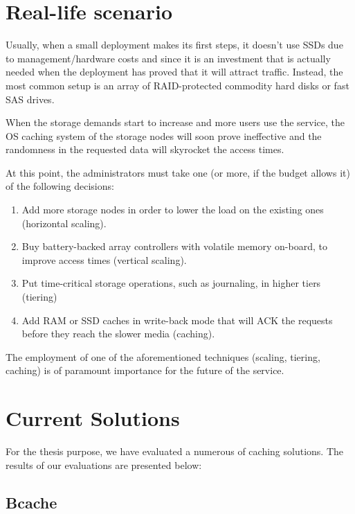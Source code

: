 \section{Real-life scenario}\label{sec:real-life-triad}

Usually, when a small deployment makes its first steps, it doesn't use SSDs due 
to management/hardware costs and since it is an investment that is actually 
needed when the deployment has proved that it will attract traffic. Instead, 
the most common setup is an array of RAID-protected commodity hard disks or 
fast SAS drives.

When the storage demands start to increase and more users use the service, the 
OS caching system of the storage nodes will soon prove ineffective and the 
randomness in the requested data will skyrocket the access times.

At this point, the administrators must take one (or more, if the budget allows 
it) of the following decisions:

\begin{enumerate}
	\item Add more storage nodes in order to lower the load on the existing 
		ones (horizontal scaling).
	\item Buy battery-backed array controllers with volatile memory on-board, 
		to improve access times (vertical scaling).
	\item Put time-critical storage operations, such as journaling, in higher 
		tiers (tiering)
	\item Add RAM or SSD caches in write-back mode that will ACK the 
		requests before they reach the slower media (caching).
\end{enumerate}

The employment of one of the aforementioned techniques (scaling, tiering, 
caching) is of paramount importance for the future of the service.

\section{Current Solutions}\label{sec:solutions-triad}

For the thesis purpose, we have evaluated a numerous of caching solutions. The 
results of our evaluations are presented below:

\subsection{Bcache}

